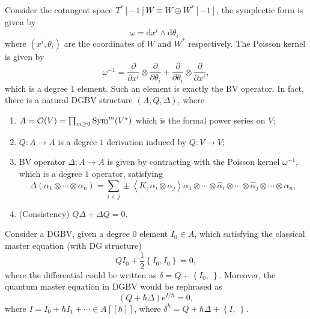 \documentclass[10pt]{article}
\begin{document}
\begin{example}
  Consider the cotangent space $ T^{*}[-1]W \equiv W \oplus W^{*}[-1]$, the symplectic form is given by
  \begin{equation*}
    \omega = \mathrm{d} x^{i} \wedge \mathrm{d} \theta_{i},
  \end{equation*}
  where $ (x^{i}, \theta_{i})$ are the coordinates of $ W$ and $ W^{*}$ respectively. The Poisson kernel is given by
  \begin{equation*}
    \omega^{-1} = \frac{\partial }{\partial x^{i}} \otimes \frac{\partial }{\partial \theta_{i}} + \frac{\partial }{\partial \theta_{i}} \otimes \frac{\partial }{\partial x^{i}},
  \end{equation*}
  which is a degree $ 1$ element. Such an element is exactly the BV operator.
  In fact, there is a natural DGBV structure $ (A, Q, \Delta)$, where
  \begin{enumerate}[(1)]
    \item $ A = \mathcal{O}(V) = \prod_{m \ge 0} \operatorname{Sym}^{m}(V^{*})$ which is the formal power series on $ V$;
    \item $ Q: A \rightarrow A$ is a degree $ 1$ derivation induced by $ Q : V \rightarrow V$;
    \item BV operator $ \Delta: A \rightarrow A$ is given by contracting with the Poisson kernel $\omega^{-1}$, which is a degree $ 1$ operator, satisfying
      \begin{equation*}
        \Delta(\alpha_1 \otimes \cdots \otimes \alpha_{n}) = \sum_{i < j} \pm \left< K, \alpha_{i} \otimes \alpha _{j} \right> \alpha_1 \otimes \cdots \otimes \hat{\alpha }_{i} \otimes \cdots \otimes \hat{\alpha }_{j} \otimes \cdots \otimes \alpha_{n},
      \end{equation*}
    \item (Consistency) $ Q \Delta + \Delta Q = 0$.
  \end{enumerate}
\end{example}
Consider a DGBV, given a degree $ 0$ element $ I_0 \in A$, which satisfying the classical master equation (with DG structure)
\begin{equation*}
  Q I_0 + \frac{1}{2} \left\{ I_0, I_0 \right\} = 0,
\end{equation*}
where the differential could be written as $ \delta = Q + \left\{ I_0, ~ \right\}$. Moreover, the quantum master equation in DGBV would be rephrased as
\begin{equation*}
  \left( Q + \hbar \Delta \right)\mathrm{e}^{I/\hbar} = 0,
\end{equation*}
where $ I = I_0 + \hbar I_1 + \cdots \in A[[\hbar]]$, where $ \delta^{\hbar} = Q + \hbar \Delta + \left\{ I, ~ \right\}$.
\end{document}
